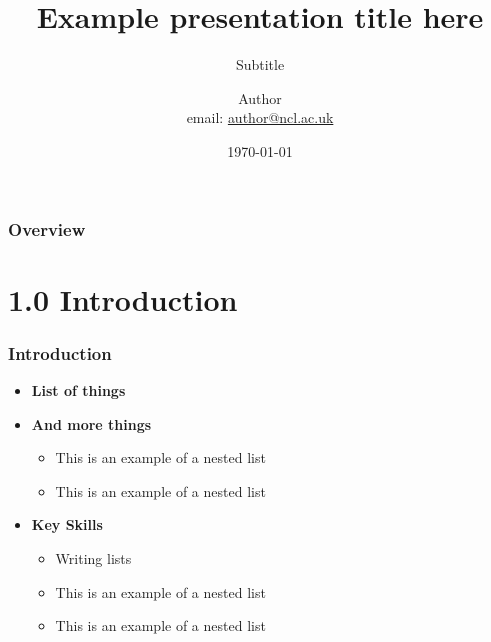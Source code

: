 \documentclass[t,compress,9pt,aspectratio=169]{beamer}
\title[Shorttitle]{\textbf{Example presentation title here}}
\subtitle{Subtitle}
\author[Shortauthor]{Author \\ \small email: \href{mailto:author@ncl.ac.uk}{author@ncl.ac.uk}}
\institute{Newcastle University}
\date{\today}
\begin{document}
\begin{frame}[plain]
\maketitle
\end{frame}



\begin{frame}
\frametitle{Overview}
\tableofcontents
\end{frame}



\section{1.0 Introduction}
\begin{frame}[fragile]
  \frametitle{Introduction}
    \begin{itemize}
      \item \textbf{List of things}
      \item \textbf{And more things}
        \begin{itemize}
      	       \item This is an example of a nested list
      	       \item This is an example of a nested list
      	\end{itemize}
      \item \textbf{Key Skills}
          \begin{itemize}
      	      \item Writing lists
      	      \item This is an example of a nested list
      	      \item This is an example of a nested list
          \end{itemize}
    \end{itemize}
\end{frame}




\end{document}
